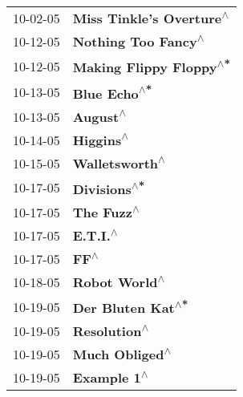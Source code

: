 \begin{supertabular}{p{0.25\columnwidth}p{0.75\columnwidth}}
 10-02-05 &                                                   \textbf{Miss Tinkle's Overture\textsuperscript{$\wedge$}} \\
 10-12-05 &                                                        \textbf{Nothing Too Fancy\textsuperscript{$\wedge$}} \\
 10-12-05 &                                                    \textbf{Making Flippy Floppy\textsuperscript{$\wedge$*}} \\
 10-13-05 &                                                               \textbf{Blue Echo\textsuperscript{$\wedge$*}} \\
 10-13-05 &                                                                   \textbf{August\textsuperscript{$\wedge$}} \\
 10-14-05 &                                                                  \textbf{Higgins\textsuperscript{$\wedge$}} \\
 10-15-05 &                                                             \textbf{Walletsworth\textsuperscript{$\wedge$}} \\
 10-17-05 &                                                               \textbf{Divisions\textsuperscript{$\wedge$*}} \\
 10-17-05 &                                                                 \textbf{The Fuzz\textsuperscript{$\wedge$}} \\
 10-17-05 &                                                                   \textbf{E.T.I.\textsuperscript{$\wedge$}} \\
 10-17-05 &                                                                       \textbf{FF\textsuperscript{$\wedge$}} \\
 10-18-05 &                                                              \textbf{Robot World\textsuperscript{$\wedge$}} \\
 10-19-05 &                                                          \textbf{Der Bluten Kat\textsuperscript{$\wedge$*}} \\
 10-19-05 &                                                               \textbf{Resolution\textsuperscript{$\wedge$}} \\
 10-19-05 &                                                             \textbf{Much Obliged\textsuperscript{$\wedge$}} \\
 10-19-05 &                                                                \textbf{Example 1\textsuperscript{$\wedge$}} \\

\end{supertabular}
